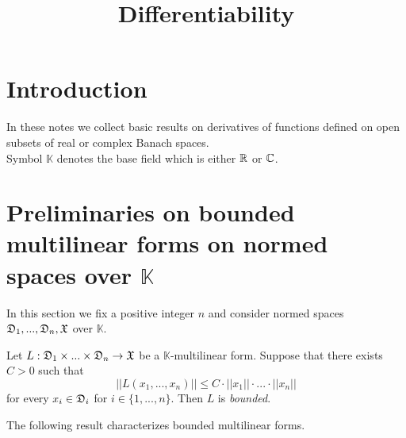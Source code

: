 



\title{Differentiability}
\date{}
\maketitle

\section{Introduction}
\noindent
In these notes we collect basic results on derivatives of functions defined on open subsets of real or complex Banach spaces.\\
Symbol $\mathbb{K}$ denotes the base field which is either ${\mathbb R}$ or ${\mathbb C}$.

\section{Preliminaries on bounded multilinear forms on normed spaces over $\mathbb{K}$}
\noindent
In this section we fix a positive integer $n$ and consider normed spaces ${\mathfrak D}_1,...,{\mathfrak D}_n, {\mathfrak X}$ over $\mathbb{K}$. 

\begin{definition}
Let $L:{\mathfrak D}_1\times ... \times {\mathfrak D}_n\rightarrow {\mathfrak X}$ be a $\mathbb{K}$-multilinear form. Suppose that there exists $C > 0$ such that
$$||L(x_1,...,x_n)|| \leq C\cdot ||x_1||\cdot ... \cdot ||x_n||$$
for every $x_i \in {\mathfrak D}_i$ for $i\in \{1,...,n\}$. Then $L$ is \textit{bounded}.
\end{definition}
\noindent
The following result characterizes bounded multilinear forms.

